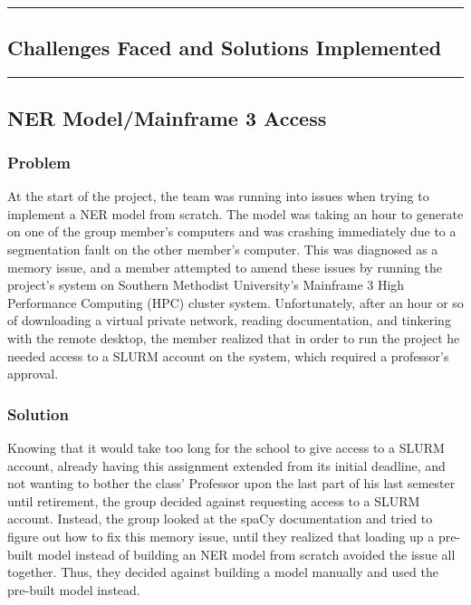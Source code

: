 {\color{gray}\hrule}
\begin{center}
\section{Challenges Faced and Solutions Implemented}
\bigskip
\end{center}
{\color{gray}\hrule}

\subsection{NER Model/Mainframe 3 Access}
\subsubsection{Problem}
At the start of the project, the team was running into issues when trying to implement a NER model from scratch. The model was taking an hour to generate on one of the group member's computers and was crashing immediately due to a segmentation fault on the other member's computer. This was diagnosed as a memory issue, and a member attempted to amend these issues by running the project's system on Southern Methodist University's Mainframe 3 High Performance Computing (HPC) cluster system. Unfortunately, after an hour or so of downloading a virtual private network, reading documentation, and tinkering with the remote desktop, the member realized that in order to run the project he needed access to a SLURM account on the system, which required a professor's approval.

\subsubsection{Solution}
Knowing that it would take too long for the school to give access to a SLURM account, already having this assignment extended from its initial deadline, and not wanting to bother the class' Professor upon the last part of his last semester until retirement, the group decided against requesting access to a SLURM account. Instead, the group looked at the spaCy documentation and tried to figure out how to fix this memory issue, until they realized that loading up a pre-built model instead of building an NER model from scratch avoided the issue all together. Thus, they decided against building a model manually and used the pre-built model instead.

\bigskip